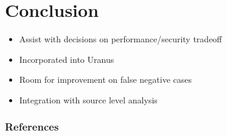 \documentclass{beamer}
\begin{document}
\section{Conclusion}
\begin{frame}
  \begin{itemize}
    \item Assist with decisions on performance/security tradeoff
    \item Incorporated into Uranus
    \item Room for improvement on false negative cases
    \item Integration with source level analysis
  \end{itemize}
\end{frame}

\begin{frame}
  \frametitle{References}
  \scriptsize
  
  
\end{frame}
\end{document}

